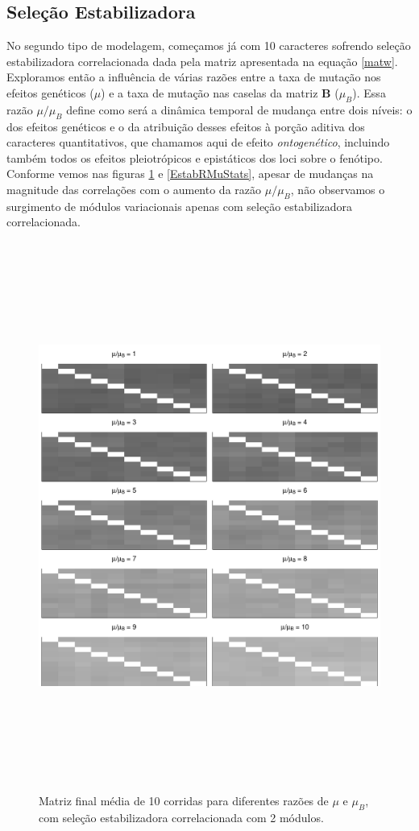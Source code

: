 \subsection{Seleção Estabilizadora}

No segundo tipo de modelagem, começamos já com 10 caracteres sofrendo
seleção estabilizadora correlacionada dada pela matriz apresentada na
equação \ref{matw}.
Exploramos então a influência de várias razões entre a taxa de mutação
nos efeitos genéticos ($\mu$) e a taxa de mutação nas caselas da matriz
$\mathbf{B}$ ($\mu_B$).
Essa razão $\mu/\mu_B$ define como será a dinâmica temporal de mudança
entre dois níveis: o dos efeitos genéticos e o da atribuição desses
efeitos à porção aditiva dos caracteres quantitativos, que chamamos aqui de efeito {\it
ontogenético}, incluindo também todos os efeitos pleiotrópicos e
epistáticos dos loci sobre o fenótipo.
Conforme vemos nas figuras \ref{MatBEstab} e \ref{EstabRMuStats}, apesar de mudanças na
magnitude das correlações com o aumento da razão $\mu/\mu_B$, não
observamos o surgimento de módulos variacionais apenas com seleção
estabilizadora correlacionada.

\begin{figure}[htbp]
    \centering
    \includegraphics[width=150mm, height=180mm]{figuras/MatBEstabRMu}
    \caption{Matriz final média de 10 corridas para diferentes razões de
        $\mu$ e $\mu_B$, com seleção estabilizadora correlacionada com 2
    módulos.}
    \label{MatBEstab}
\end{figure}

